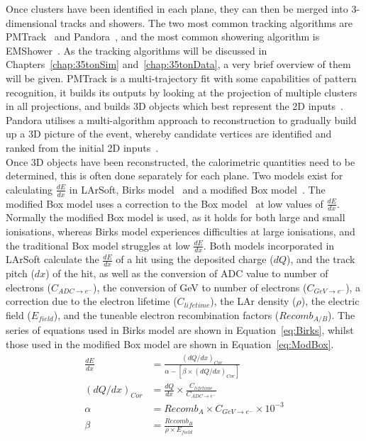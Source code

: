 Once clusters have been identified in each plane, they can then be merged into 3-dimensional tracks and showers. The two most common tracking algorithms are PMTrack~\citep{PMTrack} and Pandora~\citep{Pandora}, and the most common showering algorithm is EMShower~\citep{EMShower}. As the tracking algorithms will be discussed in Chapters~\ref{chap:35tonSim} and~\ref{chap:35tonData}, a very brief overview of them will be given. PMTrack is a multi-trajectory fit with some capabilities of pattern recognition, it builds its outputs by looking at the projection of multiple clusters in all projections, and builds 3D objects which best represent the 2D inputs~\citep{LArSoftOrg, PMTrackJanCollab}. Pandora utilises a multi-algorithm approach to reconstruction to gradually build up a 3D picture of the event, whereby candidate vertices are identified and ranked from the initial 2D inputs~\citep{LArSoftOrg}. \\

Once 3D objects have been reconstructed, the calorimetric quantities need to be determined, this is often done separately for each plane. Two models exist for calculating $\frac{dE}{dx}$ in LArSoft, Birks model~\citep{BirksModel} and a modified Box model~\citep{PIDA_Paper}. The modified Box model uses a correction to the Box model~\citep{BoxModel} at low values of $\frac{dE}{dx}$. Normally the modified Box model is used, as it holds for both large and small ionisations, whereas Birks model experiences difficulties at large ionisations, and the traditional Box model struggles at low $\frac{dE}{dx}$. Both models incorporated in LArSoft calculate the $\frac{dE}{dx}$ of a hit using the deposited charge ($dQ$), and the track pitch ($dx$) of the hit, as well as the conversion of ADC value to number of electrons ($C_{ADC \rightarrow e^{-}}$), the conversion of GeV to number of electrons ($C_{GeV \rightarrow e^{-}}$), a correction due to the electron lifetime ($C_{lifetime}$), the LAr density ($\rho$), the electric field ($E_{field}$), and the tuneable electron recombination factors ($Recomb_{A/B}$). The series of equations used in Birks model are shown in Equation~\ref{eq:Birks}, whilst those used in the modified Box model are shown in Equation~\ref{eq:ModBox}. \\

\begin{subequations}
  \label{eq:Birks}
  \begin{align}
    \frac{dE}{dx} &= \frac{ (dQ/dx)_{Cor} }{ \alpha - [\beta \times (dQ/dx)_{Cor} ] } \label{eq:Birks_1} \\
    (dQ/dx)_{Cor} &= \frac{dQ}{dx} \times \frac{ C_{lifetime} }{ C_{ADC \rightarrow e^{-}} } \label{eq:Birks_Correc} \\
    \alpha &= Recomb_{A} \times C_{GeV \rightarrow e^{-}} \times 10^{-3} \label{eq:Birks_A}\\
    \beta  &= \frac{ Recomb_{B} }{ \rho \times E_{field} } \label{eq:Birks_B}
  \end{align}
\end{subequations}

